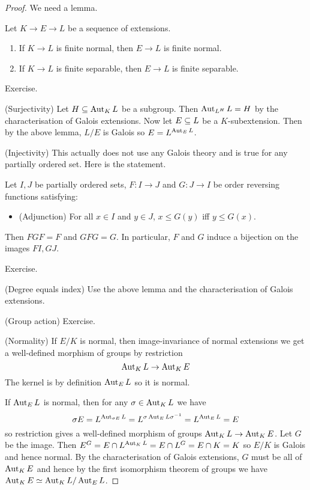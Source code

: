 \documentclass{article}
\begin{document}
\begin{proof}
  We need a lemma. 
  \begin{lem}
    Let $K \to E \to L$ be a sequence of extensions.
    \begin{enumerate}
      \item If $K \to L$ is finite normal, then $E \to L$ is finite normal.
      \item If $K \to L$ is finite separable, 
      then $E \to L$ is finite separable.
    \end{enumerate}
    \begin{proof1}
      Exercise.
    \end{proof1}
  \end{lem}
  (Surjectivity) 
  Let $H \subseteq \operatorname{Aut}_K L$ be a subgroup.
  Then $\operatorname{Aut}_{L^H} L = H$ by the characterisation of Galois extensions.
  Now let $E \subseteq L$ be a $K$-subextension.
  Then by the above lemma, $L/E$ is Galois so $E = L^{\operatorname{Aut}_E L}$.

  (Injectivity) This actually does not use any Galois theory
  and is true for any partially ordered set.
  Here is the statement.
  \begin{lem}
    Let $I, J$ be partially ordered sets,
    $F : I \to J$ and $G : J \to I$ be order reversing functions
    satisfying: 
    \begin{itemize}
      \item (Adjunction) For all $x \in I$ and $y \in J$,
      $x \leq G(y)$ iff $y \leq G(x)$.
    \end{itemize}
    Then $FGF = F$ and $GFG = G$.
    In particular, $F$ and $G$ induce a bijection on
    the images $FI, GJ$.
    \begin{proof1}
      Exercise.
    \end{proof1}
  \end{lem}
  (Degree equals index) Use the above lemma and 
  the characterisation of Galois extensions.
  
  (Group action) Exercise.

  (Normality)
  If $E / K$ is normal,
  then image-invariance of normal extensions we get a
  well-defined morphism of groups by restriction \[
    \operatorname{Aut}_K L \to \operatorname{Aut}_K E
  \]
  The kernel is by definition $\operatorname{Aut}_E L$ so it is normal.

  If $\operatorname{Aut}_E L$ is normal,
  then for any $\sigma \in \operatorname{Aut}_K L$ we have 
  \[
    \sigma E = L^{\operatorname{Aut}_{\sigma E} L}
    = L^{\sigma \operatorname{Aut}_E L \sigma^{-1}}
    = L^{\operatorname{Aut}_E L} = E
  \]
  so restriction gives a well-defined morphism of groups
  $\operatorname{Aut}_K L \to \operatorname{Aut}_K E$.
  Let $G$ be the image.
  Then $E^G = E \cap L^{\operatorname{Aut}_K L} = E \cap L^G = E \cap K = K$
  so $E / K$ is Galois and hence normal.
  By the characterisation of Galois extensions,
  $G$ must be all of $\operatorname{Aut}_K E$ and hence 
  by the first isomorphism theorem of groups 
  we have $\operatorname{Aut}_K E \simeq \operatorname{Aut}_K L / \operatorname{Aut}_E L$.

\end{proof}
\end{document}
